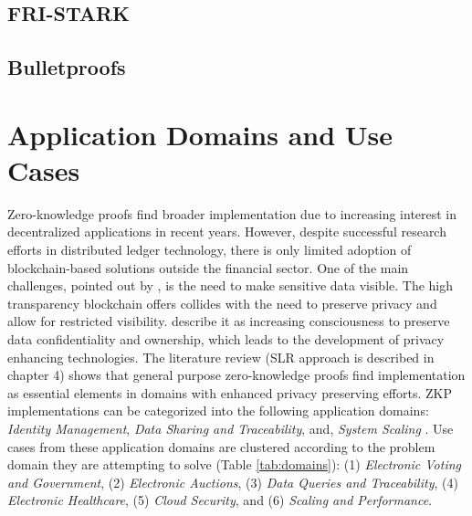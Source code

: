 \subsection{FRI-STARK}

\subsection{Bulletproofs}

\section{Application Domains and Use Cases}
Zero-knowledge proofs find broader implementation due to increasing interest in decentralized applications in recent years. However, despite successful research efforts in distributed ledger technology, there is only limited adoption of blockchain-based solutions outside the financial sector. One of the main challenges, pointed out by \citet{SedlmeirTransparencyChallenge}, is the need to make sensitive data visible. The high transparency blockchain offers collides with the need to preserve privacy and allow for restricted visibility. \citet{Godden} describe it as increasing consciousness to preserve data confidentiality and ownership, which leads to the development of privacy enhancing technologies. The literature review (SLR approach is described in chapter 4) shows that general purpose zero-knowledge proofs find implementation as essential elements in domains with enhanced privacy preserving efforts. ZKP implementations can be categorized into the following application domains: \textit{Identity Management}, \textit{Data Sharing and Traceability}, and, \textit{System Scaling} \citep{PipeZK, chen2022review, morais2019survey}. Use cases from these application domains are clustered according to the problem domain they are attempting to solve (Table \ref{tab:domains}): (1) \textit{Electronic Voting and Government}, (2) \textit{Electronic Auctions}, (3) \textit{Data Queries and Traceability}, (4) \textit{Electronic Healthcare}, (5) \textit{Cloud Security}, and (6) \textit{Scaling and Performance}.

